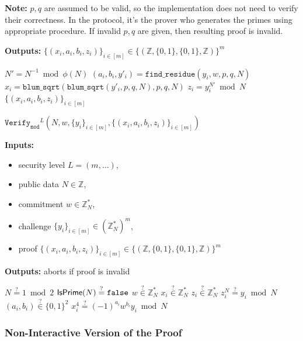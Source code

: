 \documentclass[11pt]{article}
\newenvironment{inlineAlgorithm}{}{}
\newcommand{\algoName}[1]{#1 \par}
\newcommand{\algoInputsList}[1]{
    {\small \bf Inputs:} 
        \begin{itemize}[noitemsep,topsep=0pt]
            #1
        \end{itemize}
}
\newcommand{\algoOutputs}[1]{
    {\small \bf Outputs:} #1 \par
}
\newcommand{\fn}[1]{\ensuremath{\mathtt{#1}}}
\newcommand{\verify}[1]{\ensuremath{\mathtt{Verify}_{\mathtt{#1}}}}
\newcommand{\Z}{\mathbb{Z}}
\newcommand{\?}[1]{\stackrel{?}{#1}}
\newcommand{\Bit}{\ensuremath{\{0{,}1\}}}
\begin{document}
\begin{description}
\begin{inlineAlgorithm}
{    {\bf Note:} $p, q$ are assumed to be valid, so the implementation does not need to verify their correctness. In the protocol, it's the prover who generates the primes using appropriate procedure. If invalid $p, q$ are given, then resulting proof is invalid.
}
\algoOutputs{$\{(x_i, a_i, b_i, z_i)\}_{i\in[m]} \in \{(\Z, \Bit, \Bit, \Z)\}^m$}
\begin{algorithmic}[1]
\State $N' = N^{-1} \bmod \phi(N)$
    \State $(a_i, b_i, y'_i) = \fn{find\_residue}(y_i, w, p, q, N)$
    \State $x_i = \fn{blum\_sqrt}(\fn{blum\_sqrt}(y'_i, p, q, N), p, q, N)$
    \State $z_i = y_i^{N'} \bmod N$
\EndFor
\State \Return $\{(x_i, a_i, b_i, z_i)\}_{i \in [m]}$
\end{algorithmic}
\end{inlineAlgorithm}

\item
\begin{inlineAlgorithm}
\algoName{$\verify{mod}^L(N, w, \{y_i\}_{i\in[m]}, \{(x_i, a_i, b_i, z_i)\}_{i\in[m]})$}
\algoInputsList{
    \item security level $L = (m, \dots)$,
    \item public data $N \in \Z$,
    \item commitment $w \in \Z^*_N$,
    \item challenge $\{y_i\}_{i\in[m]} \in (\Z^*_N)^m$,
    \item proof $\{(x_i, a_i, b_i, z_i)\}_{i\in[m]} \in \{(\Z, \Bit, \Bit, \Z)\}^m$
}
\algoOutputs{aborts if proof is invalid}
\begin{algorithmic}[1]
\State $N \? = 1 \bmod 2$
\State $\isprime(N) \? = \mathtt{false}$
\State $w \? \in \Z^*_N$
\Statex
{}
    \State $x_i \? \in \Z^*_N$
    \State $z_i \? \in \Z^*_N$
    \State $z_i^N \? = y_i \bmod N$
    \State $(a_i, b_i) \? \in \Bit^2$
    \State $x_i^4 \? = (-1)^{a_i}w^{b_i}y_i \bmod N$
\EndFor
\end{algorithmic}
\end{inlineAlgorithm}

\end{description}

\subsubsection{Non-Interactive Version of the Proof}
\end{document}
